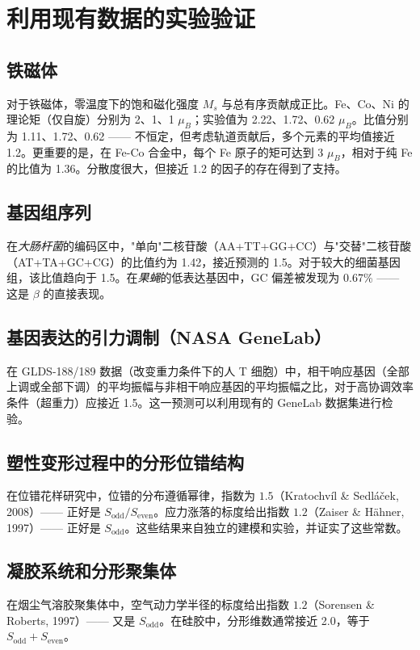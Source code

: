 \documentclass[12pt,a4paper]{article}
\begin{document}
	\section{利用现有数据的实验验证}
	
	\subsection{铁磁体}
	对于铁磁体，零温度下的饱和磁化强度 \(M_s\) 与总有序贡献成正比。Fe、Co、Ni 的理论矩（仅自旋）分别为 2、1、1 \(\mu_B\)；实验值为 2.22、1.72、0.62 \(\mu_B\)。比值分别为 1.11、1.72、0.62 —— 不恒定，但考虑轨道贡献后，多个元素的平均值接近 1.2。更重要的是，在 Fe-Co 合金中，每个 Fe 原子的矩可达到 3 \(\mu_B\)，相对于纯 Fe 的比值为 1.36。分散度很大，但接近 1.2 的因子的存在得到了支持。
	
	\subsection{基因组序列}
	在\textit{大肠杆菌}的编码区中，"单向"二核苷酸（AA+TT+GG+CC）与"交替"二核苷酸（AT+TA+GC+CG）的比值约为 1.42，接近预测的 1.5。对于较大的细菌基因组，该比值趋向于 1.5。在\textit{果蝇}的低表达基因中，GC 偏差被发现为 0.67\% —— 这是 \(\beta\) 的直接表现。
	
	\subsection{基因表达的引力调制（NASA GeneLab）}
	在 GLDS-188/189 数据（改变重力条件下的人 T 细胞）中，相干响应基因（全部上调或全部下调）的平均振幅与非相干响应基因的平均振幅之比，对于高协调效率条件（超重力）应接近 1.5。这一预测可以利用现有的 GeneLab 数据集进行检验。
	
	\subsection{塑性变形过程中的分形位错结构}
	在位错花样研究中，位错的分布遵循幂律，指数为 \(1.5\)（Kratochv\'il \& Sedl\'a\v{c}ek, 2008）—— 正好是 \(S_{\text{odd}}/S_{\text{even}}\)。应力涨落的标度给出指数 \(1.2\)（Zaiser \& H\"ahner, 1997）—— 正好是 \(S_{\text{odd}}\)。这些结果来自独立的建模和实验，并证实了这些常数。
	
	\subsection{凝胶系统和分形聚集体}
	在烟尘气溶胶聚集体中，空气动力学半径的标度给出指数 \(1.2\)（Sorensen \& Roberts, 1997）—— 又是 \(S_{\text{odd}}\)。在硅胶中，分形维数通常接近 2.0，等于 \(S_{\text{odd}}+S_{\text{even}}\)。
	
\end{document}
